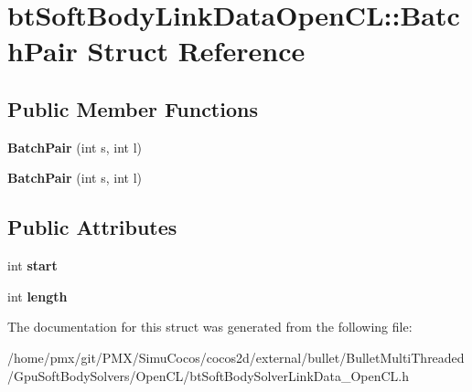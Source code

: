 \hypertarget{structbtSoftBodyLinkDataOpenCL_1_1BatchPair}{}\section{bt\+Soft\+Body\+Link\+Data\+Open\+CL\+:\+:Batch\+Pair Struct Reference}
\label{structbtSoftBodyLinkDataOpenCL_1_1BatchPair}
\subsection*{Public Member Functions}
\begin{DoxyCompactItemize}
\item 
\mbox{\label{structbtSoftBodyLinkDataOpenCL_1_1BatchPair_a927b04918a9de7b98885864618621103}} 
{\bfseries Batch\+Pair} (int s, int l)
\item 
\mbox{\label{structbtSoftBodyLinkDataOpenCL_1_1BatchPair_a927b04918a9de7b98885864618621103}} 
{\bfseries Batch\+Pair} (int s, int l)
\end{DoxyCompactItemize}
\subsection*{Public Attributes}
\begin{DoxyCompactItemize}
\item 
\mbox{\label{structbtSoftBodyLinkDataOpenCL_1_1BatchPair_ab29a8cb7332edf3d46c6f07b7416489d}} 
int {\bfseries start}
\item 
\mbox{\label{structbtSoftBodyLinkDataOpenCL_1_1BatchPair_a81827dc414b02dba4c49022ed819070c}} 
int {\bfseries length}
\end{DoxyCompactItemize}


The documentation for this struct was generated from the following file\+:\begin{DoxyCompactItemize}
\item 
/home/pmx/git/\+P\+M\+X/\+Simu\+Cocos/cocos2d/external/bullet/\+Bullet\+Multi\+Threaded/\+Gpu\+Soft\+Body\+Solvers/\+Open\+C\+L/bt\+Soft\+Body\+Solver\+Link\+Data\+\_\+\+Open\+C\+L.\+h\end{DoxyCompactItemize}
